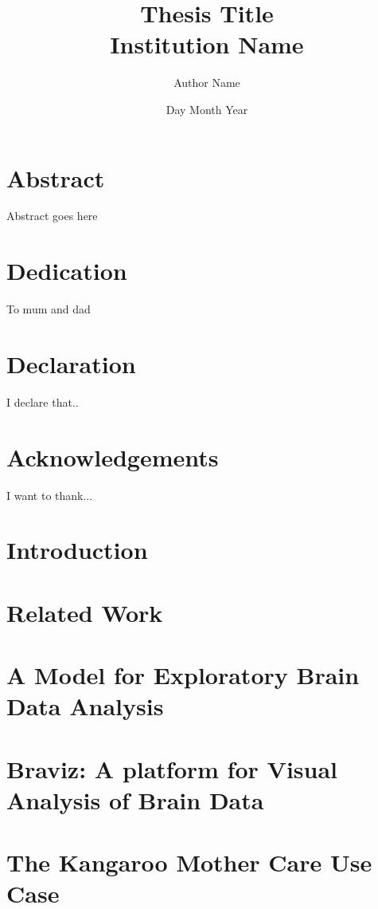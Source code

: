 \documentclass[12pt]{report}
\begin{document}
\title{
	{Thesis Title}\\
	{\large Institution Name}\\
}
\author{Author Name}
\date{Day Month Year}

\maketitle

\chapter*{Abstract}
Abstract goes here

\chapter*{Dedication}
To mum and dad

\chapter*{Declaration}
I declare that..

\chapter*{Acknowledgements}
I want to thank...

\tableofcontents

\chapter{Introduction}


\chapter{Related Work}


\chapter{A Model for Exploratory Brain Data Analysis}


\chapter{Braviz: A platform for Visual Analysis of Brain Data}


\chapter{The Kangaroo Mother Care Use Case}

\end{document}
